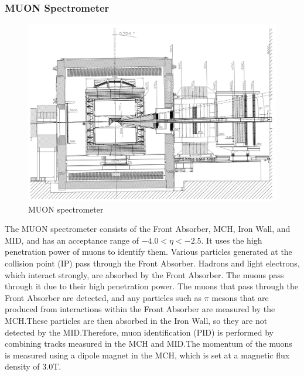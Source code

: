         \subsubsection{MUON Spectrometer}
            \begin{figure}
                \centering
                \includegraphics[keepaspectratio, scale=0.25]{fig/2_2_MUONspectrometer.png}
                \caption{MUON spectrometer}
            \end{figure}
            The MUON spectrometer consists of the Front Absorber, MCH, Iron Wall, and MID, and has an acceptance range of $-4.0 < \eta < -2.5$. It uses the high penetration power of muons to identify them. Various particles generated at the collision point (IP) pass through the Front Absorber. Hadrons and light electrons, which interact strongly, are absorbed by the Front Absorber. The muons pass through it due to their high penetration power. The muons that pass through the Front Absorber are detected, and any particles such as $\pi$ mesons that are produced from interactions within the Front Absorber are measured by the MCH.\@ These particles are then absorbed in the Iron Wall, so they are not detected by the MID.\@ Therefore, muon identification (PID) is performed by combining tracks measured in the MCH and MID.\@ The momentum of the muons is measured using a dipole magnet in the MCH, which is set at a magnetic flux density of 3.0T.\@

